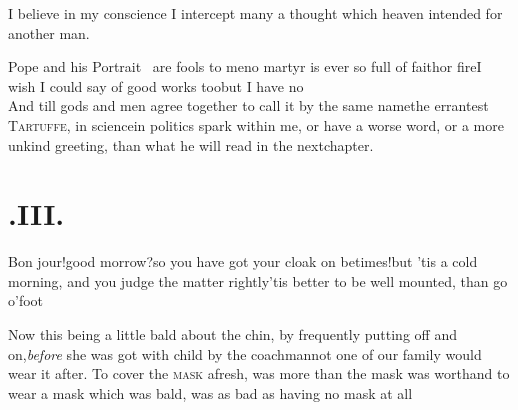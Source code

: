 \documentclass{article}
\begin{document}
I believe in my conscience I intercept many a thought which
heaven intended for another man.


Pope and his Portrait \fnast\  are fools to\break
me\tsh no martyr is ever so full of faith\break or
fire\tsh I wish I could say of good works too\tsh but I have
no\\
\break
And till gods and men agree together to call it by the same
name\tsh the errant\-est \textsc{Tartuffe}, in science\tsk in
politics\break
{}
spark within
me, or have a worse word, or a more unkind greeting,\break
{}\break
{}
\eject
\noindent
than what he will read in the next\break chapter.

\section{.\enspace III.}

\noindent\quad
\tsh Bon jour!\tsh good
morrow?\break\tsh so you have got your cloak on
betimes!\tsh but ’tis a cold morning, and you judge
the matter rightly\tsh ’tis better to be well
mounted, than go \hbox{o’\thinspace foot}\break
{}

Now this being a little bald about the chin, by frequently
putting off and on,\break \textit{before} she was got with child by the
coachman\tsk not one of our family would wear it after. To cover
the \textsc{mask} afresh, was more than the mask was
worth\tsh and to wear a mask which was bald, 
was as bad as having no mask at all\tsh
\end{document}

